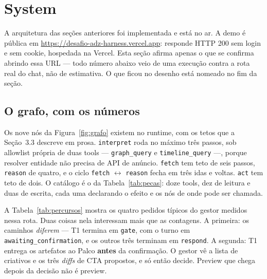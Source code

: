 \documentclass[10pt,twocolumn]{article}
\newcommand{\code}[1]{\texttt{\footnotesize #1}}
\begin{document}
\section{System}

A arquitetura das seções anteriores foi implementada e está no ar. A demo é pública em
\url{https://desafio-adz-harness.vercel.app}: responde HTTP 200 sem login e sem cookie,
hospedada na Vercel. Esta seção afirma apenas o que se confirma abrindo essa URL --- todo
número abaixo veio de uma execução contra a rota real do chat, não de estimativa. O que
ficou no desenho está nomeado no fim da seção.

\subsection{O grafo, com os números}

Os nove nós da Figura~\ref{fig:grafo} existem no runtime, com os tetos que a Seção~3.3
descreve em prosa. \code{interpret} roda no máximo três passos, sob allowlist própria de
duas tools --- \code{graph\_query} e \code{timeline\_query} ---, porque resolver entidade
não precisa de API de anúncio. \code{fetch} tem teto de seis passos, \code{reason} de
quatro, e o ciclo \code{fetch} $\leftrightarrow$ \code{reason} fecha em três idas e voltas.
\code{act} tem teto de dois. O catálogo é o da Tabela~\ref{tab:pecas}: doze tools, dez de
leitura e duas de escrita, cada uma declarando o efeito e os nós de onde pode ser chamada.

A Tabela~\ref{tab:percursos} mostra os quatro pedidos típicos do gestor medidos nessa rota.
Duas coisas nela interessam mais que as contagens. A primeira: os caminhos \emph{diferem} ---
T1 termina em \code{gate}, com o turno em \code{awaiting\_confirmation}, e os outros três
terminam em \code{respond}. A segunda: T1 entrega os artefatos ao Palco \textbf{antes} da
confirmação. O gestor vê a lista de criativos e os três \emph{diffs} de CTA propostos, e só
então decide. Preview que chega depois da decisão não é preview.
\end{document}
